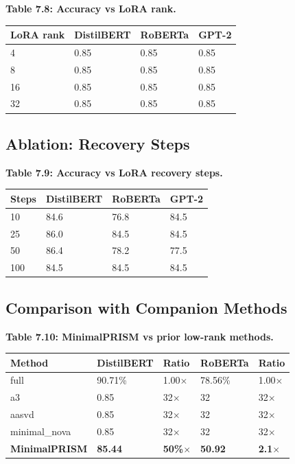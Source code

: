 \textbf{Table 7.8: Accuracy vs LoRA rank.}

\begin{table}[H]
\centering
\small
\begin{tabular}{llll}
\toprule
\textbf{LoRA rank} & \textbf{DistilBERT} & \textbf{RoBERTa} & \textbf{GPT-2} \\
\midrule
4 & 0.85 & 0.85 & 0.85 \\
8 & 0.85 & 0.85 & 0.85 \\
16 & 0.85 & 0.85 & 0.85 \\
32 & 0.85 & 0.85 & 0.85 \\
\bottomrule
\end{tabular}
\end{table}

\subsection{Ablation: Recovery Steps}

\textbf{Table 7.9: Accuracy vs LoRA recovery steps.}

\begin{table}[H]
\centering
\small
\begin{tabular}{llll}
\toprule
\textbf{Steps} & \textbf{DistilBERT} & \textbf{RoBERTa} & \textbf{GPT-2} \\
\midrule
10 & 84.6 & 76.8 & 84.5 \\
25 & 86.0 & 84.5 & 84.5 \\
50 & 86.4 & 78.2 & 77.5 \\
100 & 84.5 & 84.5 & 84.5 \\
\bottomrule
\end{tabular}
\end{table}

\subsection{Comparison with Companion Methods}

\textbf{Table 7.10: MinimalPRISM vs prior low-rank methods.}

\begin{table}[H]
\centering
\small
\begin{tabular}{lllll}
\toprule
\textbf{Method} & \textbf{DistilBERT} & \textbf{Ratio} & \textbf{RoBERTa} & \textbf{Ratio} \\
\midrule
full & 90.71\% & 1.00$\times$ & 78.56\% & 1.00$\times$ \\
a3 & 0.85 & 32$\times$ & 32 & 32$\times$ \\
aasvd & 0.85 & 32$\times$ & 32 & 32$\times$ \\
minimal\_nova & 0.85 & 32$\times$ & 32 & 32$\times$ \\
\textbf{MinimalPRISM} & \textbf{85.44} & \textbf{50\%$\times$} & \textbf{50.92} & \textbf{2.1$\times$} \\
\bottomrule
\end{tabular}
\end{table}

